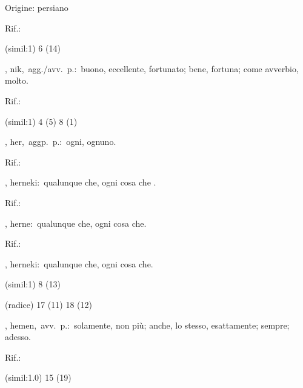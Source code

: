 \begin{glossario}{Origine: persiano}
\begin{subvocedue}
\item[Rif.:] 
\end{subvocedue}
\begin{subvocedue}
\item[(simil:1)]   6 (14)
\end{subvocedue}
\item[{\color{colorlowref}\spzrl{nIk}},] {\sf nik},\ agg./avv.\ p.:\ buono, eccellente, fortunato; bene, fortuna; come avverbio, molto.
\begin{subvocedue}
\item[Rif.:] 
\end{subvocedue}
\begin{subvocedue}
\item[(simil:1)]   4 (5) 8 (1)
\end{subvocedue}
\item[{\color{colorlowref}\spzrl{her}},] {\sf her},\ aggp.\ p.:\ ogni, ognuno.
\begin{subvocedue}
\item[Rif.:] 
\end{subvocedue}
\begin{subvocedue}
\item[\subglossariobullet] , {\sf herneki}:\ qualunque che, ogni cosa che \verificare.
\begin{subvocedue}
\item[Rif.:] 
\end{subvocedue}
\item[\subglossariobullet] , {\sf herne}:\ qualunque che, ogni cosa che.
\begin{subvocedue}
\item[Rif.:] 
\end{subvocedue}
\item[\subglossariobullet] , {\sf herneki}:\ qualunque che, ogni cosa che.
\item[(simil:1)]   8 (13)
\item[(radice)]   17 (11) 18 (12)
\end{subvocedue}
\item[{\color{colorlowref}\spzrl{himAn}},] {\sf hemen},\ avv.\ p.:\ solamente, non più; anche, lo stesso, esattamente; sempre; adesso.
\begin{subvocedue}
\item[Rif.:] 
\end{subvocedue}
\begin{subvocedue}
\item[(simil:1.0)]   15 (19)
\end{subvocedue}
\end{glossario}
